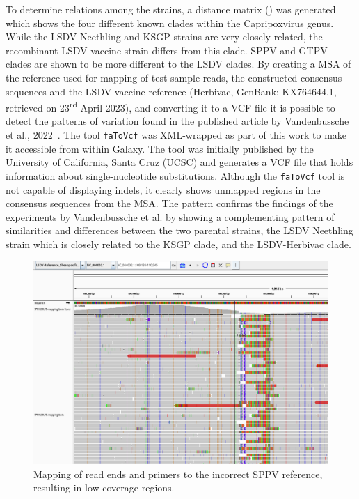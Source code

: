 To determine relations among the strains, a distance matrix () was generated which shows the four different known clades within the Capripoxvirus genus. While the \ac{LSDV}-Neethling and KSGP strains are very closely related, the recombinant \ac{LSDV}-vaccine strain differs from this clade. \ac{SPPV} and \ac{GTPV} clades are shown to be more different to the \ac{LSDV} clades. By creating a \ac{MSA} of the reference used for mapping of test sample reads, the constructed consensus sequences and the \ac{LSDV}-vaccine reference (Herbivac, GenBank: KX764644.1, retrieved on 23\textsuperscript{rd} April 2023), and converting it to a \ac{VCF} file it is possible to detect the patterns of variation found in the published article by Vandenbussche et al., 2022~\cite{vandenbussche2022recombinant}. The tool \texttt{faToVcf} was XML-wrapped as part of this work to make it accessible from within Galaxy. The tool was initially published by the University of California, Santa Cruz (UCSC) and generates a \ac{VCF} file that holds information about single-nucleotide substitutions. Although the \texttt{faToVcf} tool is not capable of displaying indels, it clearly shows unmapped regions in the consensus sequences from the \ac{MSA}. The pattern confirms the findings of the experiments by Vandenbussche et al. by showing a complementing pattern of similarities and differences between the two parental strains, the \ac{LSDV} Neethling strain which is closely related to the KSGP clade, and the \ac{LSDV}-Herbivac clade.
\begin{figure}[ht!]
	\centering
	\includegraphics[width=1\textwidth]{media/4-capv-sppv-110.png}
	\caption[Mapping of read ends and primers to incorrect SPPV reference of LSDV reads.]{Mapping of read ends and primers to the incorrect SPPV reference, resulting in low coverage regions.}
	\label{fig:4-capv-sppv-110}
\end{figure}

